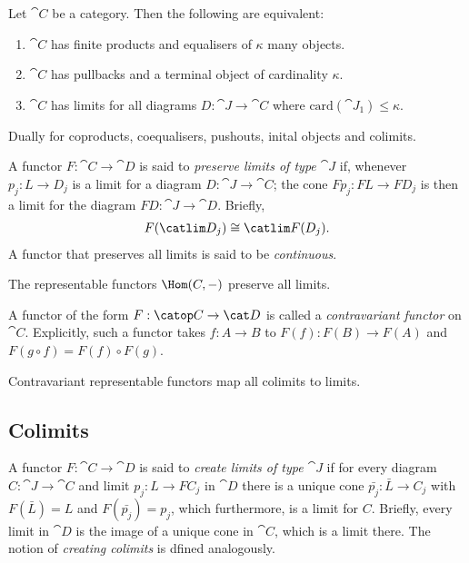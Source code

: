 \documentclass{article}
\begin{document}
\begin{proposition}[Awodey p. 105]
    Let $\cat C$ be a category. Then the following are equivalent:
    \begin{enumerate}
        \item $\cat C$ has finite products and equalisers of $\kappa$ many objects.
        \item $\cat C$ has pullbacks and a terminal object of cardinality $\kappa$.
        \item $\cat C$ has limits for all diagrams $D:\cat J\to\cat C$ where $\text{card}(\cat J_1)\leq \kappa$.
    \end{enumerate}
    Dually for coproducts, coequalisers, pushouts, inital objects and colimits.
\end{proposition}

\begin{definition}[Awodey p. 106]
    A functor $F:\cat C\to\cat D$ is said to \emph{preserve limits of type $\cat J$} if,
    whenever $p_j:L\to D_j$ is a limit for a diagram $D:\cat J\to\cat C$; the cone
    $Fp_j:FL\to FD_j$ is then a limit for the diagram $FD:\cat J\to\cat D$. Briefly,
    \begin{align*}
        F(\catlim D_j)\cong \catlim F(D_j).
    \end{align*} 
    A functor that preserves all limits is said to be \emph{continuous}.
\end{definition}

\begin{proposition}
    The representable functors $\Hom(C,-)$ preserve all limits.
\end{proposition}

\begin{definition}[Awodey p. 107]
    A functor of the form $F:\catop C\to \cat D$ is called a \emph{contravariant
    functor} on $\cat C$. Explicitly, such a functor takes $f:A\to B$ to $F(f):
    F(B)\to F(A)$ and $F(g\circ f)=F(f)\circ F(g)$.
\end{definition}

\begin{corollary}
    Contravariant representable functors map all colimits to limits.
\end{corollary}

\subsection{Colimits}

\begin{definition}[Awodey p. 110]
    A functor $F:\cat C\to\cat D$ is said to \emph{create limits of type $\cat J$}
    if for every diagram $C:\cat J\to\cat C$ and limit $p_j:L\to FC_j$ in $\cat D$
    there is a unique cone $\bar{p_j}:\bar L \to C_j$ with $F(\bar L) = L$ and
    $F(\bar{p_j})=p_j$, which furthermore, is a limit for $C$. Briefly, every limit
    in $\cat D$ is the image of a unique cone in $\cat C$, which is a limit there.
    The notion of \emph{creating colimits} is dfined analogously. 
\end{definition}
\end{document}
